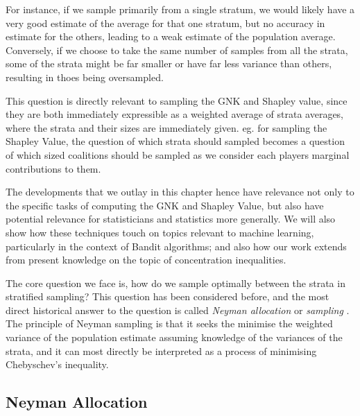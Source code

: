 For instance, if we sample primarily from a single stratum, we would likely have a very good estimate of the average for that one stratum, but no accuracy in estimate for the others, leading to a weak estimate of the population average.
Conversely, if we choose to take the same number of samples from all the strata, some of the strata might be far smaller or have far less variance than others, resulting in thoes being oversampled.

This question is directly relevant to sampling the GNK and Shapley value, since they are both immediately expressible as a weighted average of strata averages, where the strata and their sizes are immediately given. eg. for sampling the Shapley Value, the question of which strata should sampled becomes a question of which sized coalitions should be sampled as we consider each players marginal contributions to them.

The developments that we outlay in this chapter hence have relevance not only to the specific tasks of computing the GNK and Shapley Value, but also have potential relevance for statisticians and statistics more generally.
We will also show how these techniques touch on topics relevant to machine learning, particularly in the context of Bandit algorithms; and also how our work extends from present knowledge on the topic of concentration inequalities.

The core question we face is, how do we sample optimally between the strata in stratified sampling?
This question has been considered before, and the most direct historical answer to the question is called \textit{Neyman allocation} or \textit{sampling} \cite{1938.10503378,10.2307/23339498}.
The principle of Neyman sampling is that it seeks the minimise the weighted variance of the population estimate assuming knowledge of the variances of the strata, and it can most directly be interpreted as a process of minimising Chebyschev's inequality.

\subsection{Neyman Allocation}\label{sec:neyman_sampling}

